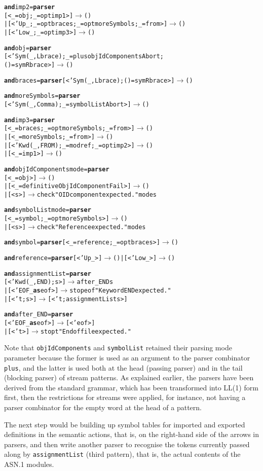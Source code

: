\begin{alltt}
\textbf{and} imp2 = \textbf{parser}
  [< \_=obj; \_=opt imp1 >] \(\rightarrow\) ()
| [< 'Up \_; \_=opt braces; \_=opt moreSymbols; \_=from >] \(\rightarrow\) ()
| [< 'Low \_; \_=opt imp3 >] \(\rightarrow\) ()

\textbf{and} obj = \textbf{parser}
  [< 'Sym (\_,Lbrace); \_=plus objIdComponents Abort;
     ()=sym Rbrace >] \(\rightarrow\) ()

\textbf{and} braces = \textbf{parser} [< 'Sym (\_,Lbrace); ()=sym Rbrace >] \(\rightarrow\) ()

\textbf{and} moreSymbols = \textbf{parser}
  [< 'Sym (\_,Comma); \_=symbolList Abort >] \(\rightarrow\) ()

\textbf{and} imp3 = \textbf{parser}
  [< \_=braces; \_=opt moreSymbols; \_=from >] \(\rightarrow\) ()
|               [< \_=moreSymbols; \_=from >] \(\rightarrow\) ()
| [< 'Kwd (\_,FROM); \_=modref; \_=opt imp2 >] \(\rightarrow\) ()
|                              [< \_=imp1 >] \(\rightarrow\) ()

\textbf{and} objIdComponents mode = \textbf{parser}
                            [< \_=obj >] \(\rightarrow\) ()
| [< \_=definitiveObjIdComponent Fail >] \(\rightarrow\) ()
| [< s >] \(\rightarrow\) check "OID component expected." mode s

\textbf{and} symbolList mode = \textbf{parser}
  [< \_=symbol; \_=opt moreSymbols >] \(\rightarrow\) ()
| [< s >] \(\rightarrow\) check "Reference expected." mode s

\textbf{and} symbol = \textbf{parser} [< \_=reference; \_=opt braces >] \(\rightarrow\) ()

\textbf{and} reference = \textbf{parser} [< 'Up \_ >] \(\rightarrow\) () | [< 'Low \_ >] \(\rightarrow\) ()

\textbf{and} assignmentList = \textbf{parser}
  [< 'Kwd(\_,END); s >] \(\rightarrow\) after\_END s
|  [< 'EOF \_ \textbf{as} eof >] \(\rightarrow\) stop eof "Keyword END expected."
|          [< 't; s >] \(\rightarrow\) [< 't; assignmentList s >]

\textbf{and} after\_END = \textbf{parser}
  [< 'EOF \_ \textbf{as} eof >] \(\rightarrow\) [< 'eof >]
|            [< 't >] \(\rightarrow\) stop t "End of file expected."
\end{alltt}
Note that \texttt{objIdComponents} and \texttt{symbolList} retained
their parsing mode parameter because the former is used as an argument
to the parser combinator \texttt{plus}, and the latter is used both at
the head (passing parser) and in the tail (blocking parser) of stream
patterns. As explained earlier, the parsers have been derived from the
standard grammar, which has been transformed into LL(1) form first,
then the restrictions for streams were applied, for instance, not
having a parser combinator for the empty word at the head of a
pattern.

The next step would be building up symbol tables for imported and
exported definitions in the semantic actions, that is, on the
right\hyp{}hand side of the arrows in parsers, and then write another
parser to recognise the tokens currently passed along by
\texttt{assignmentList} (third pattern), that is, the actual contents
of the ASN.1 modules.
